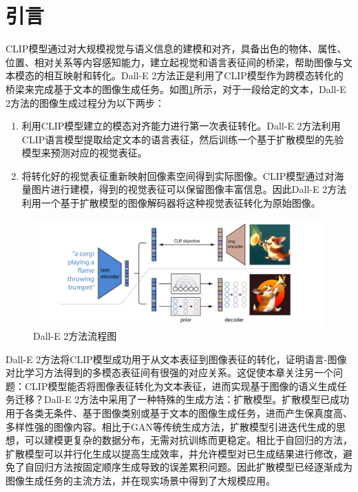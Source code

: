 \section{引言}
\label{sec:ddcap-intro}
CLIP模型通过对大规模视觉与语义信息的建模和对齐，具备出色的物体、属性、位置、相对关系等内容感知能力，建立起视觉和语言表征间的桥梁，帮助图像与文本模态的相互映射和转化。Dall-E 2方法正是利用了CLIP模型作为跨模态转化的桥梁来完成基于文本的图像生成任务。如图\ref{fig:ddcap-dalle2}所示，对于一段给定的文本，Dall-E 2方法的图像生成过程分为以下两步：
\begin{enumerate}
    \item 利用CLIP模型建立的模态对齐能力进行第一次表征转化。Dall-E 2方法利用CLIP语言模型提取给定文本的语言表征，然后训练一个基于扩散模型\cite{ddim,ddpm}的先验模型来预测对应的视觉表征。%
    \item 将转化好的视觉表征重新映射回像素空间得到实际图像。CLIP模型通过对海量图片进行建模，得到的视觉表征可以保留图像丰富信息。因此Dall-E 2方法利用一个基于扩散模型的图像解码器将这种视觉表征转化为原始图像。%
\end{enumerate}

\begin{figure}
  \centering
  \includegraphics[width=1.0\linewidth]{figures/ddcap-dalle2-v2.pdf}
  \caption{Dall-E 2\cite{dall-e2}方法流程图}
  \label{fig:ddcap-dalle2}
\end{figure}

Dall-E 2方法将CLIP模型成功用于从文本表征到图像表征的转化，证明语言-图像对比学习方法得到的多模态表征间有很强的对应关系。这促使本章关注另一个问题：CLIP模型能否将图像表征转化为文本表征，进而实现基于图像的语义生成任务迁移？Dall-E 2方法中采用了一种特殊的生成方法：扩散模型。扩散模型\cite{ddpm, ddim}已成功用于各类无条件、基于图像类别或基于文本的图像生成任务\cite{beatsgan, glide, latentdiff, imagen}，进而产生保真度高、多样性强的图像内容。相比于GAN\cite{gan}等传统生成方法，扩散模型引进迭代生成的思想，可以建模更复杂的数据分布，无需对抗训练而更稳定。相比于自回归的方法，扩散模型可以并行化生成以提高生成效率，并允许模型对已生成结果进行修改，避免了自回归方法按固定顺序生成导致的误差累积问题。因此扩散模型已经逐渐成为图像生成任务的主流方法，并在现实场景中得到了大规模应用\cite{latentdiff, dall-e2}。

